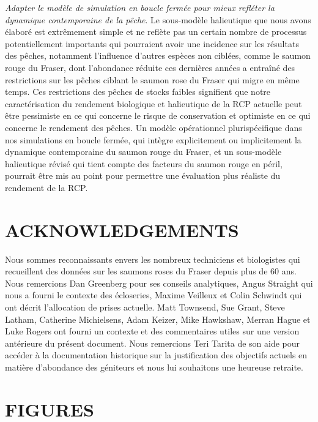 \documentclass[french,11pt]{book}
\begin{document}
\begin{itemize}
  \emph{Adapter le modèle de simulation en boucle fermée pour mieux refléter la dynamique contemporaine de la pêche}. Le sous-modèle halieutique que nous avons élaboré est extrêmement simple et ne reflète pas un certain nombre de processus potentiellement importants qui pourraient avoir une incidence sur les résultats des pêches, notamment l'influence d'autres espèces non ciblées, comme le saumon rouge du Fraser, dont l'abondance réduite ces dernières années a entraîné des restrictions sur les pêches ciblant le saumon rose du Fraser qui migre en même temps. Ces restrictions des pêches de stocks faibles signifient que notre caractérisation du rendement biologique et halieutique de la RCP actuelle peut être pessimiste en ce qui concerne le risque de conservation et optimiste en ce qui concerne le rendement des pêches. Un modèle opérationnel plurispécifique dans nos simulations en boucle fermée, qui intègre explicitement ou implicitement la dynamique contemporaine du saumon rouge du Fraser, et un sous-modèle halieutique révisé qui tient compte des facteurs du saumon rouge en péril, pourrait être mis au point pour permettre une évaluation plus réaliste du rendement de la RCP.
\end{itemize}
\hypertarget{acknowledgements}{%
\section{ACKNOWLEDGEMENTS}\label{acknowledgements}}

Nous sommes reconnaissants envers les nombreux techniciens et biologistes qui recueillent des données sur les saumons roses du Fraser depuis plus de 60 ans. Nous remercions Dan Greenberg pour ses conseils analytiques, Angus Straight qui nous a fourni le contexte des écloseries, Maxime Veilleux et Colin Schwindt qui ont décrit l'allocation de prises actuelle. Matt Townsend, Sue Grant, Steve Latham, Catherine Michielsens, Adam Keizer, Mike Hawkshaw, Merran Hague et Luke Rogers ont fourni un contexte et des commentaires utiles sur une version antérieure du présent document. Nous remercions Teri Tarita de son aide pour accéder à la documentation historique sur la justification des objectifs actuels en matière d'abondance des géniteurs et nous lui souhaitons une heureuse retraite.

\hypertarget{figures}{%
\section{FIGURES}\label{figures}}
\end{document}
